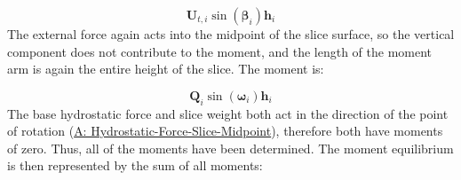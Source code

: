 \documentclass[12pt]{article}
\begin{document}
\begin{displaymath}
{\mathbf{U}_{t,i}} \sin\left({\mathbf{β}}_{i}\right) {\mathbf{h}}_{i}
\end{displaymath}
The external force again acts into the midpoint of the slice surface, so the vertical component does not contribute to the moment, and the length of the moment arm is again the entire height of the slice. The moment is:

\begin{displaymath}
{\mathbf{Q}}_{i} \sin\left({\mathbf{ω}}_{i}\right) {\mathbf{h}}_{i}
\end{displaymath}
The base hydrostatic force and slice weight both act in the direction of the point of rotation (\hyperref[assumpHFSM]{A: Hydrostatic-Force-Slice-Midpoint}), therefore both have moments of zero. Thus, all of the moments have been determined. The moment equilibrium is then represented by the sum of all moments:
\end{document}
